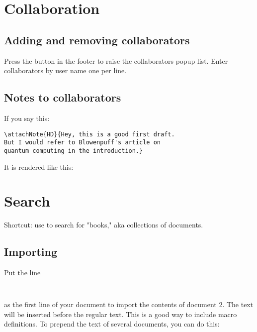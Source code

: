 \section{Collaboration}

\subsection{Adding and removing collaborators}

Press the  button in the footer to raise the collaborators popup list.  Enter collaborators by user name one per line.


\subsection{Notes to collaborators}

If you say this:

\begin{verbatim}
\attachNote{HD}{Hey, this is a good first draft.  
But I would refer to Blowenpuff's article on 
quantum computing in the introduction.}
\end{verbatim}

It is rendered like this:


\section{Search}

Shortcut: use  to search for "books," aka collections of documents.


\subsection{Importing}

Put the line 

\begin{verbatim}
  
\end{verbatim}

as the first line of your document to import the contents of document 2.  The text will be inserted before the regular text.  This is a good way to include macro definitions.  To prepend the text of several documents, you can do this:

\begin{verbatim}
  
\end{verbatim}

